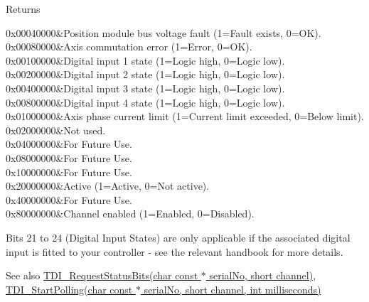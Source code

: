 \begin{DoxyReturn}{Returns}
\begin{longtabu}
0x00040000&Position module bus voltage fault (1=Fault exists, 0=OK). \\
0x00080000&Axis commutation error (1=Error, 0=OK). \\
0x00100000&Digital input 1 state (1=Logic high, 0=Logic low). \\
0x00200000&Digital input 2 state (1=Logic high, 0=Logic low). \\
0x00400000&Digital input 3 state (1=Logic high, 0=Logic low). \\
0x00800000&Digital input 4 state (1=Logic high, 0=Logic low). \\
0x01000000&Axis phase current limit (1=Current limit exceeded, 0=Below limit). \\
0x02000000&Not used. \\
0x04000000&For Future Use. \\
0x08000000&For Future Use. \\
0x10000000&For Future Use. \\
0x20000000&Active (1=Active, 0=Not active). \\
0x40000000&For Future Use. \\
0x80000000&Channel enabled (1=Enabled, 0=Disabled). \\
\end{longtabu}


Bits 21 to 24 (Digital Input States) are only applicable if the associated digital input is fitted to your controller -\/ see the relevant handbook for more details. 
\end{DoxyReturn}


\begin{DoxySeeAlso}{See also}
\hyperlink{group___t_d_i_engine_ga45c16bbd6acc7826f98464e96011a475}{T\+D\+I\+\_\+\+Request\+Status\+Bits(char const $\ast$ serial\+No, short channel)}, \hyperlink{group___t_d_i_engine_ga7c22f7f8bb3689d79de383c0c7d5c0b1}{T\+D\+I\+\_\+\+Start\+Polling(char const $\ast$ serial\+No, short channel, int milliseconds)}


\end{DoxySeeAlso}
